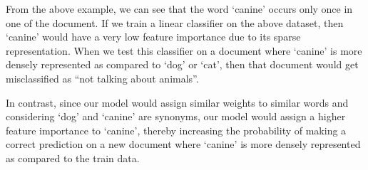 From the above example, we can see that the word ‘canine’ occurs only once in one of the document. If we train a linear classifier on the above dataset, then ‘canine’ would have a very low feature importance due to its sparse representation. When we test this classifier on a document where ‘canine’ is more densely represented as compared to ‘dog’ or ‘cat’, then that document would get misclassified as “not talking about animals”. 

In contrast, since our model would assign similar weights to similar words and considering ‘dog’ and ‘canine’ are synonyms, our model would assign a higher feature importance to ‘canine’, thereby increasing the probability of making a correct prediction on a new document where ‘canine’ is more densely represented as compared to the train data.
